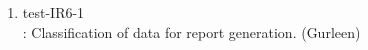 \documentclass[12pt, titlepage]{article}
\begin{document}
\begin{enumerate}
    
    

    \item{test-IR6-1\\}: Classification of data for report generation. (Gurleen) \label{test-IR6-1}
    
    
    
    
    

    
    
    
    
    

\end{enumerate}

\newpage
\end{document}
